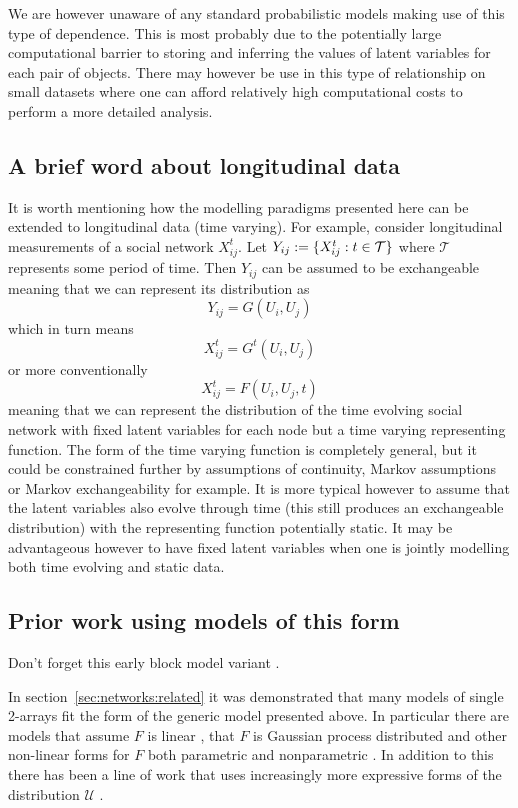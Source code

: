 We are however unaware of any standard probabilistic models making use of this type of dependence.
This is most probably due to the potentially large computational barrier to storing and inferring the values of latent variables for each pair of objects.
There may however be use in this type of relationship on small datasets where one can afford relatively high computational costs to perform a more detailed analysis.

\subsection{A brief word about longitudinal data}

It is worth mentioning how the modelling paradigms presented here can be extended to longitudinal data (\ie time varying).
For example, consider longitudinal measurements of a social network $X_{ij}^t$.
Let $Y_{ij} := \{X_{ij}^t : t \in \mathcal{T}\}$ where $\mathcal{T}$ represents some period of time.
Then $Y_{ij}$ can be assumed to be exchangeable meaning that we can represent its distribution as
\[
  Y_{ij} = G(U_i, U_j)
\]
which in turn means
\[
  X_{ij}^t = G^t(U_i, U_j)
\]
or more conventionally
\[
  X_{ij}^t = F(U_i, U_j, t)
\]
meaning that we can represent the distribution of the time evolving social network with fixed latent variables for each node but a time varying representing function.
The form of the time varying function is completely general, but it could be constrained further by assumptions of continuity, Markov assumptions or Markov exchangeability for example.
It is more typical however to assume that the latent variables also evolve through time (this still produces an exchangeable distribution) with the representing function potentially static.
It may be advantageous however to have fixed latent variables when one is jointly modelling both time evolving and static data.

\subsection{Prior work using models of this form}

Don't forget this early block model variant \cite{Hoffman_undated-ri}.

In section~\ref{sec:networks:related} it was demonstrated that many models of single 2-arrays fit the form of the generic model presented above.
In particular there are models that assume $F$ is linear \citep[e.g.][]{Hoff2007-ja, Meeds2007-gd, Salakhutdinov2008-zt, Yu2008-tz, Miller2009-wg}, that $F$ is Gaussian process distributed \citep[e.g.][]{Lawrence2009-za, Yan2011-lc, Lloyd2012-sb} and other non-linear forms for $F$ both parametric \citep[e.g.][]{Hoff2002-vy} and nonparametric \citep[e.g.][]{Roy2009-ge}.
In addition to this there has been a line of work that uses increasingly more expressive forms of the distribution $\mathcal{U}$ \citep[e.g.][]{Wang1987-jd, Nowicki2001-xm, Kemp2006-jt, Xu2006-uy, Meeds2007-gd, Miller2009-wg, Palla2012-ch}.

